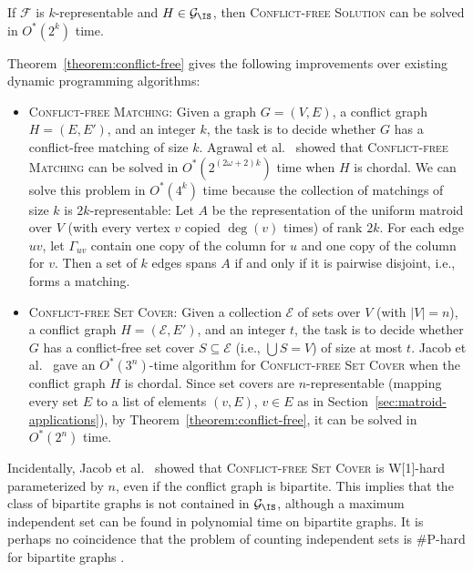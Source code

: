 \documentclass{theoretics}
\newcommand{\cE}{\ensuremath{\mathcal E}\xspace}
\newcommand{\cF}{\ensuremath{\mathcal F}\xspace}
\begin{document}
\begin{theorem} \label{theorem:conflict-free}
  If $\cF$ is $k$-representable and $H \in \mathcal{G}_{\IS}$, then 
  \textsc{Conflict-free Solution} can be solved in $O^*(2^{k})$ time.
\end{theorem}

Theorem~\ref{theorem:conflict-free} gives the following improvements over existing dynamic programming algorithms:
\begin{itemize}
  \item
  \textsc{Conflict-free Matching}: Given a graph $G = (V, E)$, a conflict graph $H = (E, E')$, and an integer $k$, the task is to decide whether $G$ has a conflict-free matching of size $k$.
  Agrawal et al.~\cite{AgrawalJKS20} showed that \textsc{Conflict-free Matching} can be solved in $O^*(2^{(2\omega + 2)k})$ time when $H$ is chordal.
  We can solve this problem in $O^*(4^k)$ time because the collection of matchings of size $k$ is $2k$-representable:
  Let $A$ be the representation of the uniform matroid over $V$ (with every vertex $v$ copied $\deg(v)$ times) of rank $2k$.
  For each edge $uv$, let $\Gamma_{uv}$ contain one copy of the column for $u$ and one copy of the column for $v$.
  Then a set of $k$ edges spans $A$ if and only if it is pairwise disjoint, i.e., forms a matching.
  \item
  \textsc{Conflict-free Set Cover}: Given a collection $\cE$ of sets over $V$ (with $|V| = n$), a conflict graph $H = (\cE, E')$, and an integer $t$, the task is to decide whether $G$ has a conflict-free set cover $S \subseteq \cE$ (i.e., $\bigcup S = V$) of size at most $t$.
  Jacob et al.~\cite{JacobMR21} gave an $O^*(3^n)$-time algorithm for \textsc{Conflict-free Set Cover} when the conflict graph $H$ is chordal.
  Since set covers are $n$-representable (mapping every set $E$ to a list of elements $(v,E)$, $v \in E$ as in Section~\ref{sec:matroid-applications}),
  by Theorem~\ref{theorem:conflict-free}, it can be solved in $O^*(2^n)$ time.
\end{itemize}

Incidentally, Jacob et al.~\cite{JacobMR21} showed that \textsc{Conflict-free Set Cover} is W[1]-hard parameterized by $n$, even if the conflict graph is bipartite.
This implies that the class of bipartite graphs is not contained in $\mathcal{G}_{\IS}$, although a maximum independent set can be found in polynomial time on bipartite graphs.
It is perhaps no coincidence that the problem of counting independent sets is \#P-hard for bipartite graphs \cite{ProvanB83}.
\end{document}
